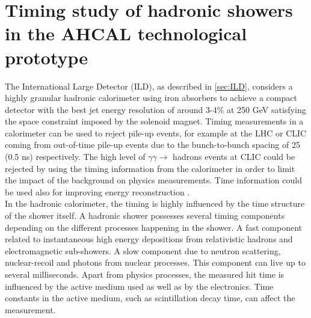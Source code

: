 {}
\chapter*{Timing study of hadronic showers in the AHCAL technological prototype}
\label{chap:TimingAHCAL}

The International Large Detector (ILD), as described in \ref{sec:ILD}, considers a highly granular hadronic calorimeter using iron absorbers to achieve a compact detector with the best jet energy resolution of around 3-4\% at 250 GeV satisfying the space constraint imposed by the solenoid magnet. Timing measurements in a calorimeter can be used to reject pile-up events, for example at the LHC or CLIC coming from out-of-time pile-up events due to the bunch-to-bunch spacing of 25 (0.5 ns) respectively. The high level of $\gamma\gamma \rightarrow$ hadrons events at CLIC could be rejected by using the timing information from the calorimeter in order to limit the impact of the background on physics measurements. Time information could be used also for improving energy reconstruction \cite{Benaglia2016}.\\

In the hadronic calorimeter, the timing is highly influenced by the time structure of the shower itself. A hadronic shower possesses several timing components depending on the different processes happening in the shower. A fast component related to instantaneous high energy depositions from relativistic hadrons and electromagnetic sub-showers. A slow component due to neutron scattering, nuclear-recoil and photons from nuclear processes. This component can live up to several milliseconds. Apart from physics processes, the measured hit time is influenced by the active medium used as well as by the electronics. Time constants in the active medium, such as scintillation decay time, can affect the measurement.\\

